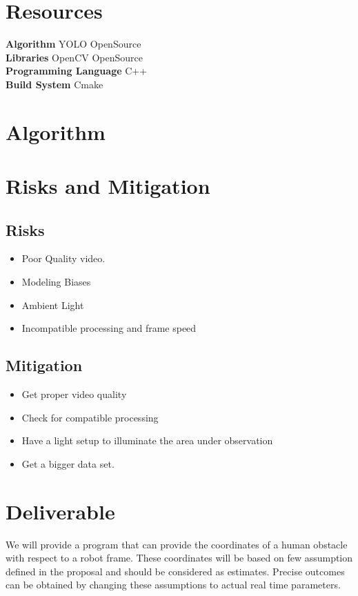 \documentclass[11pt,a4paper]{article}
\begin{document}
\section*{Resources}
\textbf{Algorithm} YOLO OpenSource\\
\textbf{Libraries} OpenCV OpenSource\\
\textbf{Programming Language} C++ \\
\textbf{Build System} Cmake \\

\section{Algorithm}

\section*{Risks and Mitigation}
\subsection*{Risks}
\begin{itemize}
  \item Poor Quality video.
  \item Modeling Biases
  \item Ambient Light
  \item Incompatible processing and frame speed
\end{itemize}
\subsection*{Mitigation}
\begin{itemize}
  \item Get proper video quality
\item Check for compatible processing
\item Have a light setup to illuminate the area under observation
\item Get a bigger data set.

\end{itemize}

\section*{Deliverable}
We will provide a program that can provide the coordinates of a human obstacle with respect to a robot frame.
These coordinates will be based on few assumption defined in the proposal and should be considered as estimates.
Precise outcomes can be obtained by changing these assumptions to actual real time parameters.
\end{document}
